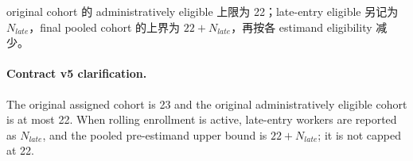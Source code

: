 original cohort 的 administratively eligible 上限为 22；late-entry eligible 另记为
\(N_{late}\)，final pooled cohort 的上界为 \(22+N_{late}\)，再按各 estimand eligibility 减少。

\paragraph{Contract v5 clarification.}
The original assigned cohort is 23 and the original administratively eligible cohort is at most 22. When rolling enrollment is active, late-entry workers are reported as \(N_{late}\), and the pooled pre-estimand upper bound is \(22+N_{late}\); it is not capped at 22.
